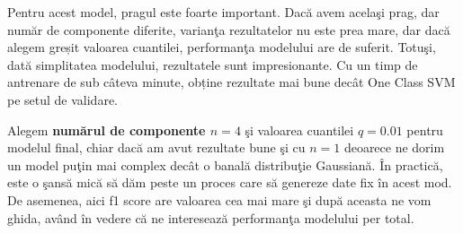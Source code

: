 Pentru acest model, pragul este foarte important. Dacă avem acelaşi prag,
dar număr de componente diferite, varianţa rezultatelor
nu este prea mare, dar dacă alegem greșit valoarea cuantilei, 
performanţa modelului are de suferit. Totuşi, 
dată simplitatea modelului, rezultatele sunt impresionante.
Cu un timp de antrenare de sub câteva minute, obține rezultate 
mai bune decât One Class SVM pe setul de validare.

Alegem \textbf{numărul de componente $n=4$} şi valoarea
cuantilei $q=0.01$ pentru modelul final, chiar dacă 
am avut rezultate bune şi cu $n=1$ deoarece ne dorim un model puţin mai complex 
decât o banală distribuţie Gaussiană. În practică, este o şansă mică să dăm peste 
un proces care să genereze date fix în acest mod. De asemenea, aici f1 score are valoarea cea mai mare
şi după aceasta ne vom ghida, având în vedere că ne interesează performanţa modelului 
per total.

